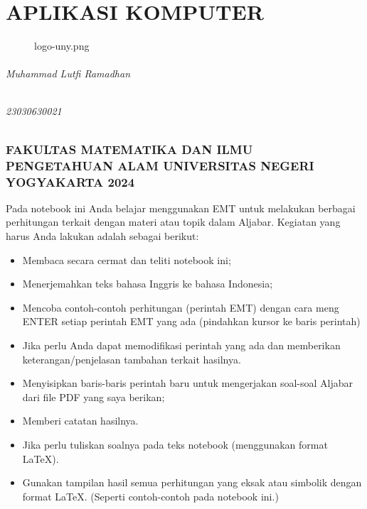 \documentclass[
]{book}
\author{}
\date{}
\makeatletter
\newcommand*\pandocbounded[1]{%
  \sbox\pandoc@box{#1}%
  \Gscale@div\@tempa{\textheight}{\dimexpr\ht\pandoc@box+\dp\pandoc@box\relax}%
  \Gscale@div\@tempb{\linewidth}{\wd\pandoc@box}%
  \ifdim\@tempb\p@<\@tempa\p@\let\@tempa\@tempb\fi%
  \ifdim\@tempa\p@<\p@\scalebox{\@tempa}{\usebox\pandoc@box}%
  \else\usebox{\pandoc@box}%
  \fi%
}
\makeatother
\begin{document}
\frontmatter

\mainmatter
\chapter{APLIKASI KOMPUTER}\label{aplikasi-komputer}

\begin{figure}
\centering
\pandocbounded{\texttt{[image: ./logo-uny.png]}}
\caption{logo-uny.png}
\end{figure}

\subparagraph{Muhammad Lutfi Ramadhan}\label{muhammad-lutfi-ramadhan}

\subparagraph{23030630021}\label{section}

\subsection{FAKULTAS MATEMATIKA DAN ILMU PENGETAHUAN ALAM UNIVERSITAS NEGERI YOGYAKARTA 2024}\label{fakultas-matematika-dan-ilmu-pengetahuan-alam-universitas-negeri-yogyakarta-2024}

Pada notebook ini Anda belajar menggunakan EMT untuk melakukan berbagai perhitungan terkait dengan materi atau topik dalam Aljabar. Kegiatan yang harus Anda lakukan adalah sebagai berikut:

\begin{itemize}
\item
  Membaca secara cermat dan teliti notebook ini;
\item
  Menerjemahkan teks bahasa Inggris ke bahasa Indonesia;
\item
  Mencoba contoh-contoh perhitungan (perintah EMT) dengan cara meng ENTER setiap perintah EMT yang ada (pindahkan kursor ke baris perintah)
\item
  Jika perlu Anda dapat memodifikasi perintah yang ada dan memberikan keterangan/penjelasan tambahan terkait hasilnya.
\item
  Menyisipkan baris-baris perintah baru untuk mengerjakan soal-soal Aljabar dari file PDF yang saya berikan;
\item
  Memberi catatan hasilnya.
\item
  Jika perlu tuliskan soalnya pada teks notebook (menggunakan format LaTeX).
\item
  Gunakan tampilan hasil semua perhitungan yang eksak atau simbolik dengan format LaTeX. (Seperti contoh-contoh pada notebook ini.)
\end{itemize}
\end{document}
